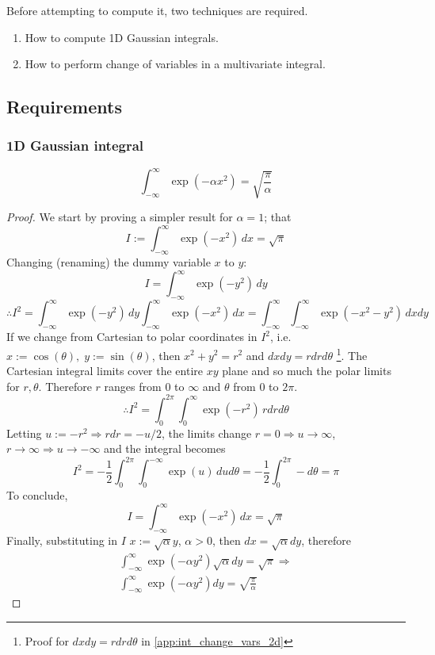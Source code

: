 \documentclass[a4paper]{article}
\begin{document}
Before attempting to compute it, two techniques are required.
\begin{enumerate}
	\item How to compute 1D Gaussian integrals.
	\item How to perform change of variables in a multivariate integral.
\end{enumerate}



\subsection{Requirements}

\subsubsection{1D Gaussian integral}
\begin{corollary}
\label{cor:gauss_int_1d}
\begin{equation}
	\int_{-\infty}^\infty \exp(-\alpha x^2) = \sqrt{\frac{\pi}{\alpha}}
	\label{eq:gaussian_int_1d}
\end{equation}	
\end{corollary}
\begin{proof}

We start by proving a simpler result for $\alpha=1$; that
	\[
	I := \int_{-\infty}^\infty \exp(-x^2)\, dx = \sqrt{\pi}
	\]
	Changing (renaming) the dummy variable $x$ to $y$:
	\[
	I = \int_{-\infty}^\infty \exp(-y^2)\,dy
	\]
	\[
		\therefore I^2 =\int_{-\infty}^\infty \exp(-y^2)\,dy\int_{-\infty}^\infty \exp(-x^2)\,dx = \int_{-\infty}^\infty\int_{-\infty}^\infty \exp(-x^2-y^2) \,dxdy
	\]
	If we change from Cartesian to polar coordinates in $I^2$, i.e. $x:=\cos(\theta), \; y:=\sin(\theta)$, then $x^2+y^2=r^2$ and $dxdy = rdrd\theta$ \footnote{Proof for $dxdy=rdrd\theta$ in \ref{app:int_change_vars_2d}}. The Cartesian integral limits cover the entire $xy$ plane and so much the polar limits for $r,\theta$. Therefore $r$ ranges from $0$ to $\infty$ and $\theta$ from $0$ to $2\pi$.
	\[
		\therefore I^2 = \int_0^{2\pi}\int_0^{\infty}\exp(-r^2)\,rdrd\theta
	\]
Letting $u:=-r^2\Rightarrow rdr = -u/2$, the limits change $r=0 \Rightarrow u\rightarrow \infty$,\; $r\rightarrow \infty \Rightarrow u \rightarrow -\infty$ and the integral becomes
	\[
		I^2 = - \frac{1}{2} \int_0^{2\pi}\int_0^{-\infty}\exp(u)\,dud\theta = - \frac{1}{2} \int_0^{2\pi}-d\theta = \pi
	\]
To conclude,
	\[
	I = \int_{-\infty}^\infty \exp(-x^2)\, dx = \sqrt{\pi}
	\]
	Finally, substituting in $I$ $x := \sqrt{\alpha} y$, $\alpha>0$, then $dx = \sqrt{\alpha}dy$, therefore
	\begin{gather*}
		\int_{-\infty}^\infty \exp(-\alpha y^2) \sqrt{\alpha}dy = \sqrt{\pi} \Rightarrow \\
		\int_{-\infty}^\infty \exp(-\alpha y^2) dy = \sqrt{\frac{\pi}{\alpha}} 
	\end{gather*}
\end{proof}
\end{document}
